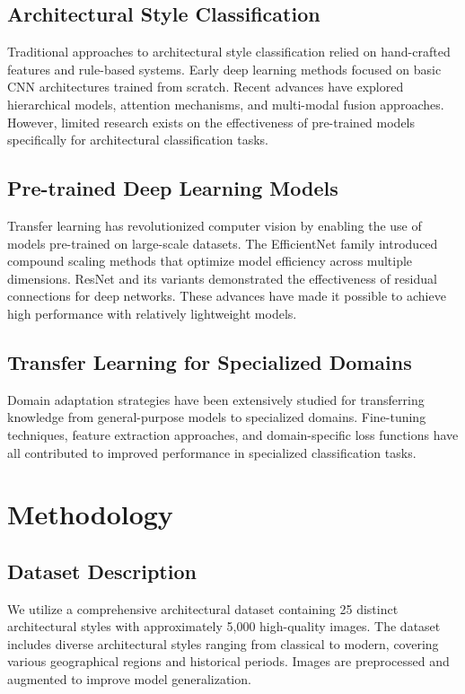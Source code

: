 \documentclass[conference]{IEEEtran}
\begin{document}
\subsection{Architectural Style Classification}

Traditional approaches to architectural style classification relied on hand-crafted features and rule-based systems. Early deep learning methods focused on basic CNN architectures trained from scratch. Recent advances have explored hierarchical models, attention mechanisms, and multi-modal fusion approaches. However, limited research exists on the effectiveness of pre-trained models specifically for architectural classification tasks.

\subsection{Pre-trained Deep Learning Models}

Transfer learning has revolutionized computer vision by enabling the use of models pre-trained on large-scale datasets. The EfficientNet family introduced compound scaling methods that optimize model efficiency across multiple dimensions. ResNet and its variants demonstrated the effectiveness of residual connections for deep networks. These advances have made it possible to achieve high performance with relatively lightweight models.

\subsection{Transfer Learning for Specialized Domains}

Domain adaptation strategies have been extensively studied for transferring knowledge from general-purpose models to specialized domains. Fine-tuning techniques, feature extraction approaches, and domain-specific loss functions have all contributed to improved performance in specialized classification tasks.

\section{Methodology}

\subsection{Dataset Description}

We utilize a comprehensive architectural dataset containing 25 distinct architectural styles with approximately 5,000 high-quality images. The dataset includes diverse architectural styles ranging from classical to modern, covering various geographical regions and historical periods. Images are preprocessed and augmented to improve model generalization.
\end{document}
